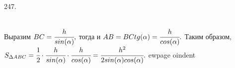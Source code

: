247. \begin{figure}[ht!]
\end{figure}\\
Выразим $BC=\cfrac{h}{sin(\alpha)},$ тогда и $AB=BC tg(\alpha)=\cfrac{h}{cos(\alpha)}.$ Таким образом, $S_{\Delta ABC}=
\cfrac{1}{2}\cdot\cfrac{h}{sin(\alpha)}\cdot\cfrac{h}{cos(\alpha)}=
\cfrac{h^2}{2sin(\alpha)cos(\alpha)}.$
ewpage
oindent
